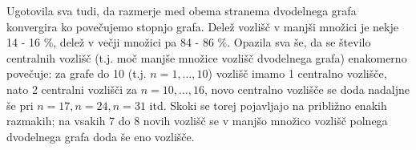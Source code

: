 \documentclass[a4paper,12pt]{article}
\begin{document}
Ugotovila sva tudi, da razmerje med obema stranema dvodelnega grafa konvergira ko povečujemo stopnjo grafa. Delež vozlišč v manjši 
množici je nekje 14 - 16 \%, delež v večji množici pa 84 - 86 \%. Opazila sva še, da se število centralnih vozlišč (t.j. moč manjše množice 
vozlišč dvodelnega grafa) enakomerno povečuje: za grafe do 10 (t.j. $n = 1, \ldots ,10$) vozlišč imamo 1 centralno vozlišče, nato 2 centralni
vozlišči za $n = 10, \ldots ,16$, novo centralno vozlišče se doda nadaljne še pri $n = 17, n =24, n = 31$ itd.
Skoki se torej pojavljajo na približno enakih razmakih; na vsakih 7 do 8 novih vozlišč se v manjšo množico vozlišč polnega dvodelnega 
grafa doda še eno vozlišče.

\nocite{Luke2013Metaheuristics}

\newpage


      
\end{document}
